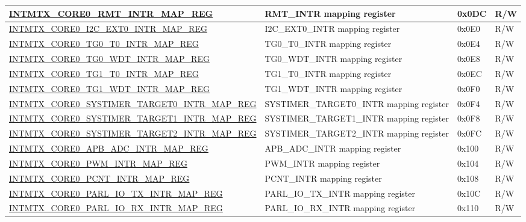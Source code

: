 \begin{longtable}{ | p{10cm} | p{10cm} | p{1.3cm} | p{1cm} | }
\hyperref[regdesc:INTMTXCORE0RMTINTRMAPREG]{INTMTX\_CORE0\_RMT\_INTR\_MAP\_REG} & RMT\_INTR mapping register & 0x0DC & R/W  \\ \hline
\hyperref[regdesc:INTMTXCORE0I2CEXT0INTRMAPREG]{INTMTX\_CORE0\_I2C\_EXT0\_INTR\_MAP\_REG} & I2C\_EXT0\_INTR mapping register & 0x0E0 & R/W  \\ \hline
\hyperref[regdesc:INTMTXCORE0TG0T0INTRMAPREG]{INTMTX\_CORE0\_TG0\_T0\_INTR\_MAP\_REG} & TG0\_T0\_INTR mapping register & 0x0E4 & R/W  \\ \hline
\hyperref[regdesc:INTMTXCORE0TG0WDTINTRMAPREG]{INTMTX\_CORE0\_TG0\_WDT\_INTR\_MAP\_REG} & TG0\_WDT\_INTR mapping register & 0x0E8 & R/W  \\ \hline
\hyperref[regdesc:INTMTXCORE0TG1T0INTRMAPREG]{INTMTX\_CORE0\_TG1\_T0\_INTR\_MAP\_REG} & TG1\_T0\_INTR mapping register & 0x0EC & R/W  \\ \hline
\hyperref[regdesc:INTMTXCORE0TG1WDTINTRMAPREG]{INTMTX\_CORE0\_TG1\_WDT\_INTR\_MAP\_REG} & TG1\_WDT\_INTR mapping register & 0x0F0 & R/W  \\ \hline
\hyperref[regdesc:INTMTXCORE0SYSTIMERTARGET0INTRMAPREG]{INTMTX\_CORE0\_SYSTIMER\_TARGET0\_INTR\_MAP\_REG} & SYSTIMER\_TARGET0\_INTR mapping register & 0x0F4 & R/W  \\ \hline
\hyperref[regdesc:INTMTXCORE0SYSTIMERTARGET1INTRMAPREG]{INTMTX\_CORE0\_SYSTIMER\_TARGET1\_INTR\_MAP\_REG} & SYSTIMER\_TARGET1\_INTR mapping register & 0x0F8 & R/W  \\ \hline
\hyperref[regdesc:INTMTXCORE0SYSTIMERTARGET2INTRMAPREG]{INTMTX\_CORE0\_SYSTIMER\_TARGET2\_INTR\_MAP\_REG} & SYSTIMER\_TARGET2\_INTR mapping register & 0x0FC & R/W  \\ \hline
\hyperref[regdesc:INTMTXCORE0APBADCINTRMAPREG]{INTMTX\_CORE0\_APB\_ADC\_INTR\_MAP\_REG} & APB\_ADC\_INTR mapping register & 0x100 & R/W  \\ \hline
\hyperref[regdesc:INTMTXCORE0PWMINTRMAPREG]{INTMTX\_CORE0\_PWM\_INTR\_MAP\_REG} & PWM\_INTR mapping register & 0x104 & R/W  \\ \hline
\hyperref[regdesc:INTMTXCORE0PCNTINTRMAPREG]{INTMTX\_CORE0\_PCNT\_INTR\_MAP\_REG} & PCNT\_INTR mapping register & 0x108 & R/W  \\ \hline
\hyperref[regdesc:INTMTXCORE0PARLIOTXINTRMAPREG]{INTMTX\_CORE0\_PARL\_IO\_TX\_INTR\_MAP\_REG} & PARL\_IO\_TX\_INTR mapping register & 0x10C & R/W  \\ \hline
\hyperref[regdesc:INTMTXCORE0PARLIORXINTRMAPREG]{INTMTX\_CORE0\_PARL\_IO\_RX\_INTR\_MAP\_REG} & PARL\_IO\_RX\_INTR mapping register & 0x110 & R/W  \\ \hline

\end{longtable}
